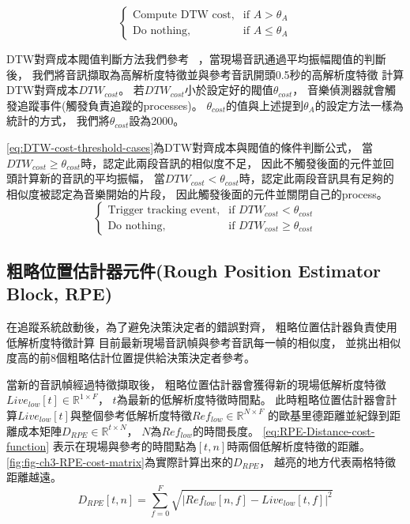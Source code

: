 \documentclass[class=NCU_thesis, crop=false]{standalone}
\begin{document}
\begin{equation} 
    \label{eq:amplitude-threshold-cases}
    \begin{cases}
        \text{Compute DTW cost}, & \text{if $A > \theta _{A}$} \\
        \text{Do nothing},  & \text{if $A \leq \theta _{A}$}
    \end{cases}
\end{equation}

DTW對齊成本閥值判斷方法我們參考~\cite{Lin2020AHumanComputerDuetSystem}
，當現場音訊通過平均振幅閥值的判斷後，
我們將音訊擷取為高解析度特徵並與參考音訊開頭0.5秒的高解析度特徵
計算DTW對齊成本${DTW_{cost}}$。
若${DTW_{cost}}$小於設定好的閥值$\theta _{cost}$，
音樂偵測器就會觸發追蹤事件(觸發負責追蹤的processes)。
$\theta _{cost}$的值與上述提到$\theta _{A}$的設定方法一樣為統計的方式，
我們將$\theta _{cost}$設為2000。

\cref{eq:DTW-cost-threshold-cases}為DTW對齊成本與閥值的條件判斷公式，
當$DTW_{cost} \geq \theta _{cost}$時，認定此兩段音訊的相似度不足，
因此不觸發後面的元件並回頭計算新的音訊的平均振幅，
當$DTW_{cost}  < \theta _{cost}$時，認定此兩段音訊具有足夠的相似度被認定為音樂開始的片段，
因此觸發後面的元件並關閉自己的process。
\begin{equation}
    \label{eq:DTW-cost-threshold-cases}
    \begin{cases}
        \text{Trigger tracking event}, & \text{if $DTW_{cost} < \theta _{cost}$} \\
        \text{Do nothing}, & \text{if $DTW_{cost} \geq \theta _{cost}$}
    \end{cases}
\end{equation}

\subsection{粗略位置估計器元件(Rough Position Estimator Block, RPE)} \label{ch3-subst-RPE}
在追蹤系統啟動後，為了避免決策決定者的錯誤對齊，
粗略位置估計器負責使用低解析度特徵計算
目前最新現場音訊幀與參考音訊每一幀的相似度，
並挑出相似度高的前8個粗略估計位置提供給決策決定者參考。

當新的音訊幀經過特徵擷取後，
粗略位置估計器會獲得新的現場低解析度特徵$Live_{low}[t] \in \mathbb{R}^{1 \times F}$，
$t$為最新的低解析度特徵時間點。
此時粗略位置估計器會計算$Live_{low}[t]$與整個參考低解析度特徵$Ref_{low} \in \mathbb{R}^{N \times F}$
的歐基里德距離並紀錄到距離成本矩陣$D_{RPE} \in \mathbb{R}^{t \times N}$，
$N$為$Ref_{low}$的時間長度。
\cref{eq:RPE-Distance-cost-function}
表示在現場與參考的時間點為$[t, n]$時兩個低解析度特徵的距離。
\cref{fig:fig-ch3-RPE-cost-matrix}為實際計算出來的$D_{RPE}$，
越亮的地方代表兩格特徵距離越遠。
\begin{equation}
    \label{eq:RPE-Distance-cost-function}
    D_{RPE}[t, n] = \sum_{f = 0}^{F}\sqrt{
    \left\lvert Ref_{low}[n, f]-Live_{low}[t, f]\right\rvert^{2}} 
\end{equation}
\end{document}
